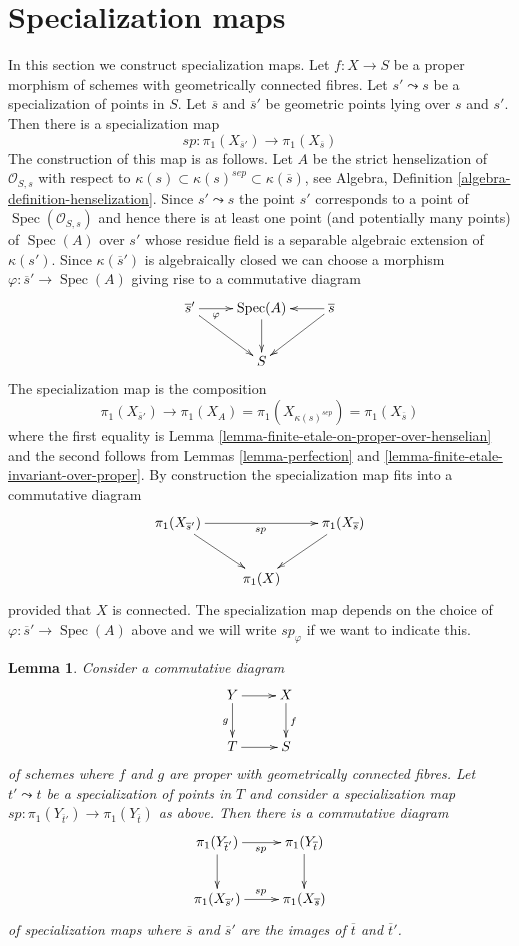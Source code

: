 \documentclass{stacks-project}
\theoremstyle{plain}
\newtheorem{lemma}[subsection]{Lemma}
\theoremstyle{definition}
\theoremstyle{remark}
\numberwithin{equation}{subsection}
\def\Spec{\mathop{\mathrm{Spec}}}
\begin{document}
\section{Specialization maps}
\label{section-specialization-map}

\noindent
In this section we construct specialization maps.
Let $f : X \to S$ be a proper morphism of schemes
with geometrically connected fibres.
Let $s' \leadsto s$ be a specialization of points in $S$.
Let $\overline{s}$ and $\overline{s}'$ be geometric points
lying over $s$ and $s'$. Then there is a specialization map
$$
sp : \pi_1(X_{\overline{s}'}) \longrightarrow \pi_1(X_{\overline{s}})
$$
The construction of this map is as follows. Let $A$ be the
strict henselization of $\mathcal{O}_{S, s}$ with respect to
$\kappa(s) \subset \kappa(s)^{sep} \subset \kappa(\overline{s})$, see
Algebra, Definition \ref{algebra-definition-henselization}.
Since $s' \leadsto s$ the point $s'$ corresponds to a point of
$\Spec(\mathcal{O}_{S, s})$ and hence there is at least one point
(and potentially many points)
of $\Spec(A)$ over $s'$ whose residue field is a separable algebraic
extension of $\kappa(s')$.
Since $\kappa(\overline{s}')$ is algebraically closed we can choose
a morphism $\varphi : \overline{s}' \to \Spec(A)$ giving rise to a commutative
diagram
$$
\xymatrix{
\overline{s}' \ar[r]_-\varphi \ar[rd] &
\Spec(A) \ar[d] &
\overline{s} \ar[l] \ar[ld] \\
& S
}
$$
The specialization map is the composition
$$
\pi_1(X_{\overline{s}'}) \longrightarrow
\pi_1(X_A) =
\pi_1(X_{\kappa(s)^{sep}}) =
\pi_1(X_{\overline{s}})
$$
where the first equality is
Lemma \ref{lemma-finite-etale-on-proper-over-henselian}
and the second follows from
Lemmas \ref{lemma-perfection} and
\ref{lemma-finite-etale-invariant-over-proper}.
By construction the specialization map fits into a commutative
diagram
$$
\xymatrix{
\pi_1(X_{\overline{s}'}) \ar[rr]_{sp} \ar[rd] & &
\pi_1(X_{\overline{s}}) \ar[ld] \\
& \pi_1(X)
}
$$
provided that $X$ is connected. The specialization map depends on the
choice of $\varphi : \overline{s}' \to \Spec(A)$ above and we will
write $sp_\varphi$ if we want to indicate this.

\begin{lemma}
\label{lemma-specialization-map-base-change}
Consider a commutative diagram
$$
\xymatrix{
Y \ar[d]_g \ar[r] & X \ar[d]^f \\
T \ar[r] & S
}
$$
of schemes where $f$ and $g$ are proper with geometrically connected
fibres. Let $t' \leadsto t$ be a specialization of points in $T$
and consider a specialization map
$sp : \pi_1(Y_{\overline{t}'}) \to \pi_1(Y_{\overline{t}})$ as above.
Then there is a commutative diagram
$$
\xymatrix{
\pi_1(Y_{\overline{t}'}) \ar[r]_{sp} \ar[d] & \pi_1(Y_{\overline{t}}) \ar[d] \\
\pi_1(X_{\overline{s}'}) \ar[r]^{sp} & \pi_1(X_{\overline{s}})
}
$$
of specialization maps where $\overline{s}$ and $\overline{s}'$
are the images of $\overline{t}$ and $\overline{t}'$.
\end{lemma}
\end{document}
